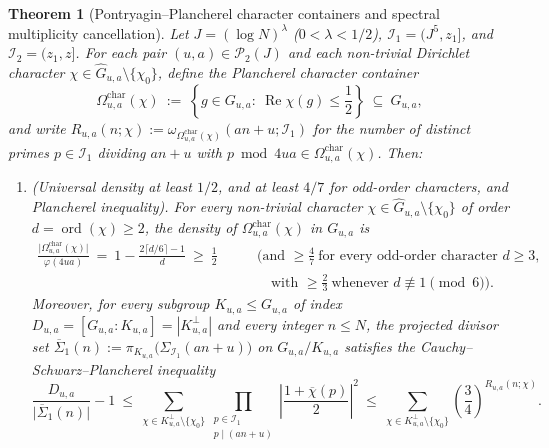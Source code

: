 \documentclass[11pt, a4paper]{article}
\theoremstyle{plain}
\newtheorem{theorem}{Theorem}[section]
\theoremstyle{definition}
\begin{document}
\begin{theorem}[Pontryagin--Plancherel character containers and spectral multiplicity cancellation]\label{thm:plancherel_character_containers}
Let $J=(\log N)^{\lambda}$ ($0<\lambda<1/2$), $\mathcal{I}_1=(J^{5},z_1]$, and $\mathcal{I}_2=(z_1,z]$. For each pair $(u,a)\in\mathcal{P}_2(J)$ and each non-trivial Dirichlet character $\chi\in\widehat{G}_{u,a}\setminus\{\chi_0\}$, define the \emph{Plancherel character container}
\begin{equation}\label{eq:plancherel_char_container_def}
\Omega_{u,a}^{\mathrm{char}}(\chi)\ :=\ \left\{g\in G_{u,a}:\ \operatorname{Re}\chi(g)\le\frac12\right\}\ \subseteq\ G_{u,a},
\end{equation}
and write $R_{u,a}(n;\chi):=\omega_{\Omega_{u,a}^{\mathrm{char}}(\chi)}(an+u;\mathcal{I}_1)$ for the number of distinct primes $p\in\mathcal{I}_1$ dividing $an+u$ with $p\bmod 4ua\in\Omega_{u,a}^{\mathrm{char}}(\chi)$. Then:
\begin{enumerate}[label=(\alph*)]
    \item \emph{(Universal density at least $1/2$, and at least $4/7$ for odd-order characters, and Plancherel inequality).} 
    For every non-trivial character $\chi\in\widehat{G}_{u,a}\setminus\{\chi_0\}$ of order $d=\operatorname{ord}(\chi)\ge2$, the density of $\Omega_{u,a}^{\mathrm{char}}(\chi)$ in $G_{u,a}$ is
    \begin{equation}\label{eq:plancherel_container_density}
    \begin{aligned}
    \frac{\big|\Omega_{u,a}^{\mathrm{char}}(\chi)\big|}{\varphi(4ua)}\ =\ 1-\frac{2\lceil d/6\rceil-1}{d}\ \ge\ \frac12\qquad
    &\Big(\text{and }\ge\frac47\ \text{for every odd-order character }d\ge3,\\
    &\quad\text{with }\ge\frac23\ \text{whenever }d\not\equiv1\pmod 6\Big).
    \end{aligned}
    \end{equation}
    Moreover, for every subgroup $K_{u,a}\le G_{u,a}$ of index $D_{u,a}=[G_{u,a}:K_{u,a}]=|K_{u,a}^{\perp}|$ and every integer $n\le N$, the projected divisor set $\overline{\Sigma}_1(n):=\pi_{K_{u,a}}\big(\Sigma_{\mathcal{I}_1}(an+u)\big)$ on $G_{u,a}/K_{u,a}$ satisfies the Cauchy--Schwarz--Plancherel inequality
    \begin{equation}\label{eq:plancherel_fundamental_inequality}
    \frac{D_{u,a}}{\big|\overline{\Sigma}_1(n)\big|}-1\ \le\ \sum_{\chi\in K_{u,a}^{\perp}\setminus\{\chi_0\}}\prod_{\substack{p\in\mathcal{I}_1\\ p\mid(an+u)}}\left|\frac{1+\overline{\chi}(p)}{2}\right|^{2}\ \le\ \sum_{\chi\in K_{u,a}^{\perp}\setminus\{\chi_0\}}\left(\frac34\right)^{R_{u,a}(n;\chi)}.
    \end{equation}
    

\end{enumerate}
\end{theorem}
\end{document}
